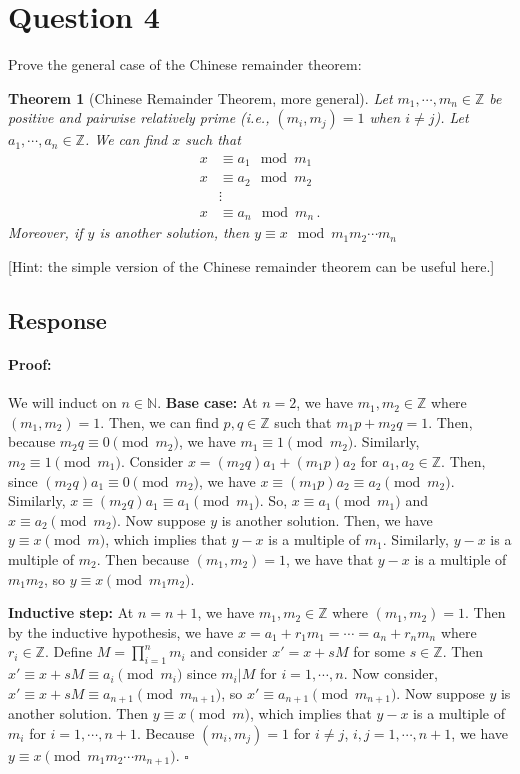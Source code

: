 \documentclass [12pt] {article}
\newtheorem{theorem}{Theorem}
\newcommand{\N}{\mathbb{N}}
\newcommand{\Z}{\mathbb{Z}}
\newenvironment{proof}{\paragraph{Proof:}}{\hfill$\square$}
\begin{document}
\section*{Question 4}
Prove the general case of the Chinese remainder theorem: 

\begin{theorem}[Chinese Remainder Theorem, more general]
    Let $m_1,\cdots,m_n\in\Z$ be positive and pairwise relatively prime (i.e., $(m_i,m_j)=1$ when $i\neq j$). Let $a_1,\cdots,a_n\in \Z$. We can find $x$ such that 
    \begin{align*}
        x &\equiv a_1\mod m_1 \\
        x &\equiv a_2\mod m_2 \\
        &\vdots \\
        x &\equiv a_n\mod m_n\,.
    \end{align*}
    Moreover, if $y$ is another solution, then $y\equiv x\mod m_1m_2\cdots m_n$
\end{theorem}
[Hint: the simple version of the Chinese remainder theorem can be useful here.]

\subsection*{Response}
\begin{proof}
    We will induct on $n \in \N$. 
    \newline
    \textbf{Base case:} At $n = 2$, we have $m_1, m_2 \in \Z$ where $(m_1, m_2) = 1$. Then, we can 
    find $p, q \in \Z$ such that $m_1 p + m_2 q = 1$. Then, because $m_2 q \equiv 0 \pmod{m_2}$, we 
    have $m_1 \equiv 1 \pmod{m_2}$. Similarly, $m_2 \equiv 1 \pmod{m_1}$. Consider 
    $x = (m_2 q)a_1 + (m_1 p)a_2$ for $a_1, a_2 \in \Z$. Then, since $(m_2 q)a_1 \equiv 0 \pmod{m_2}$, we have
    $x \equiv (m_1 p)a_2 \equiv a_2 \pmod{m_2}$. Similarly, $x \equiv (m_2 q)a_1 \equiv a_1 \pmod{m_1}$.
    So, $x \equiv a_1 \pmod{m_1}$ and $x \equiv a_2 \pmod{m_2}$. Now suppose $y$ is another solution.
    Then, we have $y \equiv x \pmod{m}$, which implies that $y - x$ is a multiple of $m_1$. Similarly,
    $y - x$ is a multiple of $m_2$. Then because $(m_1, m_2) = 1$, we have that $y - x$ is a 
    multiple of $m_1 m_2$, so $y \equiv x \pmod{m_1 m_2}$. \vspace{12pt}

    \textbf{Inductive step:} At $n = n + 1$, we have $m_1, m_2 \in \Z$ where $(m_1, m_2) = 1$. Then
    by the inductive hypothesis, we have $x = a_1 + r_1 m_1 = \cdots = a_n + r_n m_n$ where 
    $r_i \in \Z$. Define $M = \prod^{n}_{i = 1} m_i$ and consider $x' = x + sM$ for some $s \in \Z$. 
    Then $x' \equiv x + sM \equiv a_i \pmod{m_i}$ since $m_i | M$ for $i = 1, \cdots, n$. Now consider,
    $x' \equiv x + sM \equiv a_{n + 1} \pmod{m_{n + 1}}$, so $x' \equiv a_{n + 1} \pmod{m_{n + 1}}$.
    Now suppose $y$ is another solution. Then $y \equiv x \pmod{m}$, which implies that $y - x$ is a
    multiple of $m_i$ for $i = 1, \cdots, n + 1$. Because $(m_i, m_j) = 1$ for $i \neq j$,
    $i, j = 1, \cdots, n + 1$, we have $y \equiv x \pmod{m_1 m_2 \cdots m_{n + 1}}$.
\end{proof}
\newpage
\end{document}
